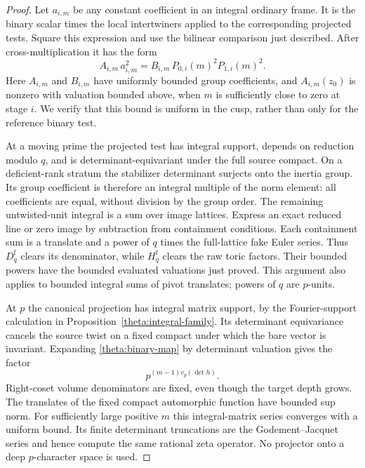 \begin{proof}
Let $a_{i,m}$ be any constant coefficient in an integral ordinary
frame.  It is the binary scalar times the local intertwiners
applied to the corresponding projected tests.  Square this
expression and use the bilinear comparison just described.
After cross-multiplication it has the form
\begin{equation}\label{theta:cleared-boundary}
 A_{i,m}\,a_{i,m}^{2}
     =B_{i,m}\,P_{0,i}(m)^2P_{1,i}(m)^2.
\end{equation}
Here $A_{i,m}$ and $B_{i,m}$ have uniformly bounded group
coefficients, and $A_{i,m}(z_0)$ is nonzero with valuation bounded
above, when $m$ is sufficiently close to zero at stage $i$.
We verify that this bound is uniform in the cusp, rather than
only for the reference binary test.

At a moving prime the projected test has integral support,
depends on reduction modulo $q$, and is determinant-equivariant
under the full source compact.  On a deficient-rank stratum the
stabilizer determinant surjects onto the inertia group.  Its group
coefficient is therefore an integral multiple of the norm element:
all coefficients are equal, without division by the group order.
The remaining untwisted-unit integral is a sum over image
lattices.  Express an exact reduced line or zero image by
subtraction from containment conditions.  Each containment sum is
a translate and a power of $q$ times the full-lattice fake Euler
series.  Thus $D_q^{\mathrm f}$ clears its denominator, while
$H_q^{\mathrm f}$ clears the raw toric factors.  Their bounded
powers have the bounded evaluated valuations just proved.  This
argument also applies to bounded integral sums of pivot
translates; powers of $q$ are $p$-units.

At $p$ the canonical projection has integral matrix support, by
the Fourier-support calculation in
Proposition~\ref{theta:integral-family}.  Its determinant
equivariance cancels the source twist on a fixed compact under
which the bare vector is invariant.  Expanding
\eqref{theta:binary-map} by determinant valuation gives the factor
\[
                 p^{(m-1)v_p(\det h)}.
\]
Right-coset volume denominators are fixed, even though the target
depth grows.  The translates of the fixed compact automorphic
function have bounded sup norm.  For sufficiently large positive
$m$ this integral-matrix series converges with a uniform bound.
Its finite determinant truncations are the
Godement--Jacquet series and hence compute the same rational zeta
operator.  No projector onto a deep $p$-character space is used.


\end{proof}
